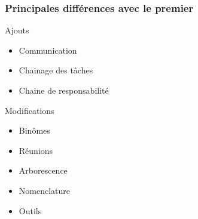 \begin{frame}
\frametitle{Principales différences avec le premier}

\begin{block}{Ajouts}
\begin{itemize}
	\item Communication %
	\item Chainage des tâches %
	\item Chaine de responsabilité %
\end{itemize}
\end{block} %

\begin{block}{Modifications}
\begin{itemize}
	\item Binômes %
	\item Réunions %
	\item Arborescence %
	\item Nomenclature %
	\item Outils %
\end{itemize}
\end{block} %

\end{frame} %

